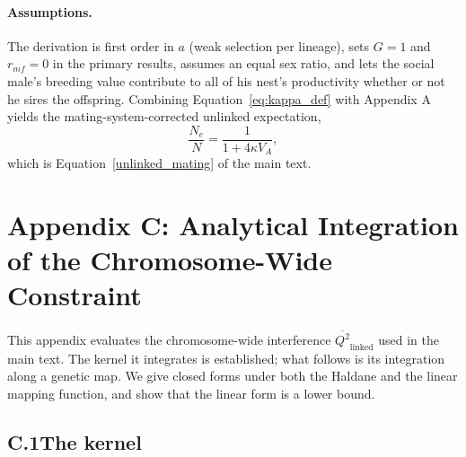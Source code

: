 \documentclass[12pt]{article}
\begin{document}
\paragraph{Assumptions.} The derivation is first order in $a$ (weak selection per lineage), sets $G = 1$ and $r_{mf} = 0$ in the primary results, assumes an equal sex ratio, and lets the social male's breeding value contribute to all of his nest's productivity whether or not he sires the offspring. Combining Equation~\eqref{eq:kappa_def} with Appendix A yields the mating-system-corrected unlinked expectation,
\begin{equation}
    \frac{N_e}{N} = \frac{1}{1 + 4\kappa V_A},
\end{equation}
which is Equation~\eqref{unlinked_mating} of the main text.

\section{Appendix C: Analytical Integration of the Chromosome-Wide Constraint}\label{app:chromosapp}

This appendix evaluates the chromosome-wide interference $\overline{Q^2}_\text{linked}$ used in the main text. The kernel it integrates is established; what follows is its integration along a genetic map. We give closed forms under both the Haldane and the linear mapping function, and show that the linear form is a lower bound.

\subsection*{C.1\quad The kernel}
\end{document}
